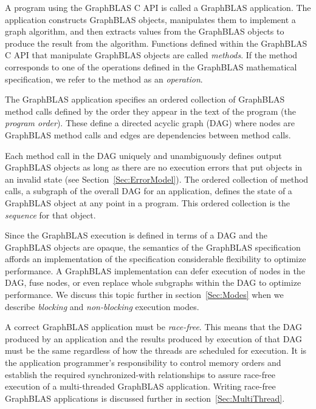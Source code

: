 A program using the GraphBLAS C API is called
a GraphBLAS application.  The application constructs GraphBLAS objects,
manipulates them to implement a graph algorithm, and then extracts
values from the GraphBLAS objects to produce the result from the algorithm. 
Functions defined within the GraphBLAS C API that manipulate GraphBLAS
objects are called \emph{methods}.  If the method corresponds to one
of the operations defined in the GraphBLAS mathematical specification,
we refer to the method as an \emph{operation}.

The GraphBLAS application specifies an ordered collection of 
GraphBLAS method calls defined by the order
they appear in the text of the program (the \emph{program order}).  
These define a directed acyclic graph (DAG) where nodes are GraphBLAS
method calls and edges are dependencies between method calls.  

Each method call in the DAG uniquely and unambiguously defines output
GraphBLAS objects as long as there are no execution errors that
put objects in an invalid state (see Section~\ref{Sec:ErrorModel}).
The ordered collection of method calls, a subgraph of the overall DAG for an application,
defines the state of a GraphBLAS object at any point in a program.  This ordered collection 
is the \emph{sequence} for that object.  

Since the GraphBLAS execution is defined in terms of a DAG and the 
GraphBLAS objects are opaque, the semantics of the GraphBLAS specification
affords an implementation of the specification considerable flexibility 
to optimize performance.  A GraphBLAS implementation can defer execution 
of nodes in the DAG, fuse nodes, or even replace whole subgraphs within the DAG 
to optimize performance.  We discuss this topic further in section~\ref{Sec:Modes} when we 
describe  \emph{blocking} and \emph{non-blocking} execution modes.

A correct GraphBLAS application must be \emph{race-free}.  This means that the DAG 
produced by an application and the results produced by execution of that DAG must be the same
regardless of how the threads are scheduled for execution.  It is the application programmer's 
responsibility to control memory orders and establish the required synchronized-with
relationships to assure race-free execution of a multi-threaded GraphBLAS 
application.  Writing race-free GraphBLAS applications is discussed further in section~\ref{Sec:MultiThread}.


